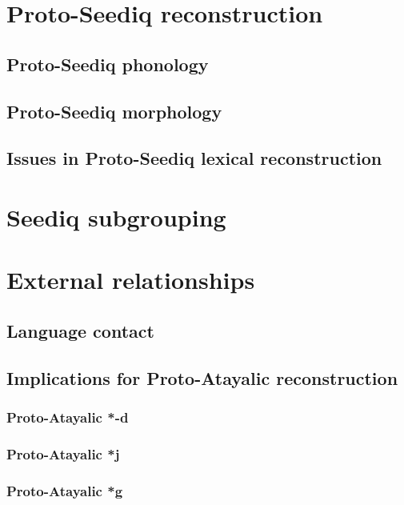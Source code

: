 \documentclass[master]{NTHUthesis}
\begin{document}
\chapter{Proto-Seediq reconstruction}

\section{Proto-Seediq phonology}

\section{Proto-Seediq morphology}

\section{Issues in Proto-Seediq lexical reconstruction}

\chapter{Seediq subgrouping}

\chapter{External relationships}

\section{Language contact}

\section{Implications for Proto-Atayalic reconstruction}

\subsection{Proto-Atayalic *-d}

\subsection{Proto-Atayalic *j}

\subsection{Proto-Atayalic *g}
\end{document}
